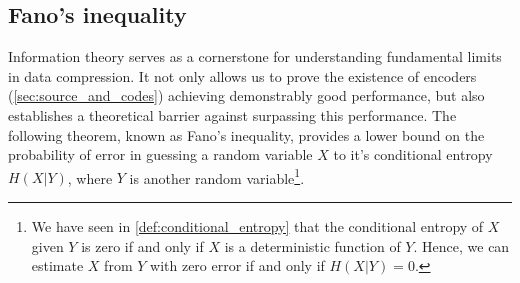 





\subsection{Fano's inequality}

Information theory serves as a cornerstone for understanding fundamental limits in data compression. It not only allows us to prove the existence of encoders (\autoref{sec:source_and_codes}) achieving demonstrably good performance, but also establishes a theoretical barrier against surpassing this performance. The following theorem, known as Fano's inequality, provides a lower bound on the probability of error in guessing a random variable $X$ to it's conditional entropy $H(X|Y)$, where $Y$ is another random variable\footnote{We have seen in \ref{def:conditional_entropy} that the conditional entropy of $X$ given $Y$ is zero if and only if $X$ is a deterministic function of $Y$. Hence, we can estimate $X$ from $Y$ with zero error if and only if $H(X|Y) = 0$.}.

